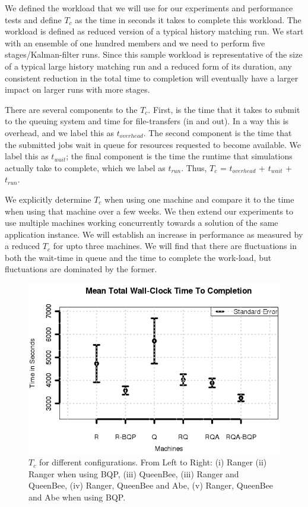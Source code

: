 \documentclass{sig-alternate}
\newcommand{\tc}{$T_c$ }
\newcommand{\tcnsp}{$T_c$}
\newcommand{\up}{\vspace*{-0.3em}}
\begin{document}
We defined the workload that we will use for our experiments and performance tests and define \tc as the time in seconds it takes to complete this workload. The workload is defined as reduced version of a typical history matching run. We start with an ensemble of one hundred members and we need to perform five stages/Kalman-filter runs. Since this sample workload is representative of the size of a typical large history matching run and a reduced form of its duration, any consistent reduction in the total time to completion will eventually have a larger impact on larger runs with more stages.

There are several components to the \tcnsp. First, is the time that it takes to submit to the queuing system and time for file-transfers (in and out). In a way this is overhead, and we label this as $t_{overhead}$.  The second component is the time that the submitted jobs wait in queue for resources requested to become available. We label this as $t_{wait}$; the final component is the time the runtime that simulations actually take to complete, which we label as $t_{run}$. Thus, \tc = $t_{overhead}$ + $t_{wait}$ + $t_{run}$.

We explicitly determine \tc when using one machine and compare it to the time when using that machine over a few weeks. We then extend our experiments to use multiple machines working concurrently towards a solution of the same application instance.  We will establish an increase in performance as measured by a reduced \tc for upto three machines.  We will find that there are fluctuations in both the wait-time in queue and the time to complete the work-load, but fluctuations are dominated by the former.

\begin{figure}
\begin{center}
\includegraphics[scale=0.5]{./figures/Figure7.png}
\end{center}
\up\up\up\up\up\up\up\up\up
\caption{\tc for different configurations.  From Left to Right: (i)
  Ranger (ii) Ranger when using BQP, (iii) QueenBee, (iii) Ranger
  and QueenBee, (iv) Ranger, QueenBee and Abe, (v) Ranger, QueenBee 
  and Abe when using BQP.}
\label{fig:results}
\up\up\up\up\up\up
\end{figure}
\end{document}
